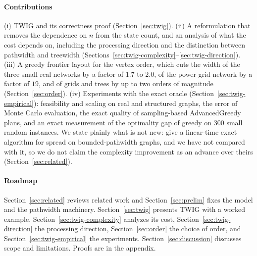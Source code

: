 \documentclass[preprint,11pt]{elsarticle}
\theoremstyle{definition}
\theoremstyle{remark}
\begin{document}
\paragraph{Contributions} (i) TWIG and its correctness proof (Section~\ref{sec:twig}). (ii) A reformulation that removes the dependence on $n$ from the state count, and an analysis of what the cost depends on, including the processing direction and the distinction between pathwidth and treewidth (Sections~\ref{sec:twig-complexity}--\ref{sec:twig-direction}). (iii) A greedy frontier layout for the vertex order, which cuts the width of the three small real networks by a factor of $1.7$ to $2.0$, of the power-grid network by a factor of $19$, and of grids and trees by up to two orders of magnitude (Section~\ref{sec:order}). (iv) Experiments with the exact oracle (Section~\ref{sec:twig-empirical}): feasibility and scaling on real and structured graphs, the error of Monte Carlo evaluation, the exact quality of sampling-based AdvancedGreedy plans, and an exact measurement of the optimality gap of greedy on 300 small random instances. We state plainly what is not new: \citet{nakamura2026} give a linear-time exact algorithm for spread on bounded-pathwidth graphs, and we have not compared with it, so we do not claim the complexity improvement as an advance over theirs (Section~\ref{sec:related}).

\paragraph{Roadmap} Section~\ref{sec:related} reviews related work and Section~\ref{sec:prelim} fixes the model and the pathwidth machinery. Section~\ref{sec:twig} presents TWIG with a worked example. Section~\ref{sec:twig-complexity} analyzes its cost, Section~\ref{sec:twig-direction} the processing direction, Section~\ref{sec:order} the choice of order, and Section~\ref{sec:twig-empirical} the experiments. Section~\ref{sec:discussion} discusses scope and limitations. Proofs are in the appendix.
\end{document}

